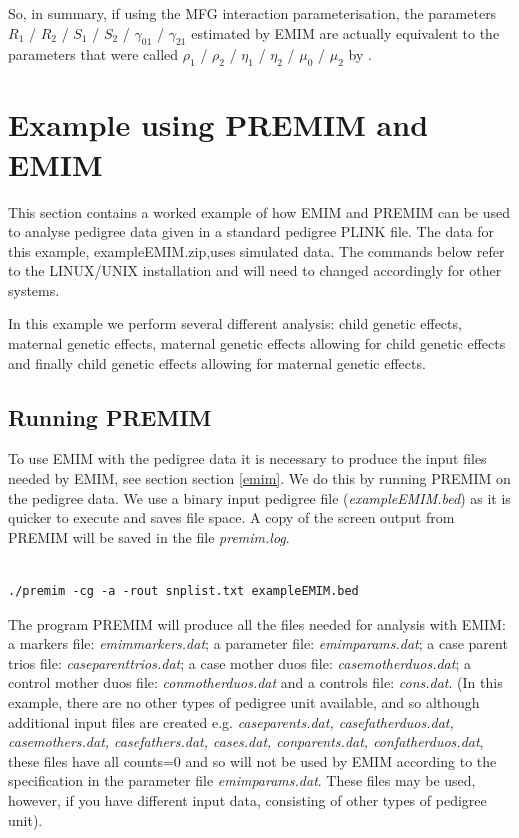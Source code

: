 \documentclass[a4paper,12pt]{article}
\begin{document}
So, in summary, if using the \citet{sinsheimer:etal:03} MFG interaction parameterisation, the parameters $R_1$ / $R_2$ / $S_1$ / $S_2$ / $\gamma_{01}$ / $\gamma_{21}$ estimated by EMIM are actually equivalent to the parameters that were called $\rho_1$ / $\rho_2$ / $\eta_1$ / $\eta_2$ / $\mu_0$ / $\mu_2$ by \citet{sinsheimer:etal:03}. 




\section{Example using PREMIM and EMIM}
\label{example}

This section contains a worked example of how EMIM and PREMIM can be used to analyse pedigree data given in a standard pedigree PLINK file. The data for this example, exampleEMIM.zip,uses simulated data. The commands below refer to the LINUX/UNIX installation and will need to changed accordingly for other systems. 

In this example we perform several different analysis: child genetic effects, maternal genetic effects, maternal genetic effects allowing for child genetic effects and finally child genetic effects allowing for maternal genetic effects. 
\subsection{Running PREMIM}
\label{eg-run-premim}

To use EMIM with the pedigree data it is necessary to produce the input files needed by EMIM, see section  section \ref{emim}. We do this by running PREMIM on the pedigree data. We use a binary input pedigree file ({\it exampleEMIM.bed}) as it is quicker to execute and saves file space. A copy of the screen output from PREMIM will be saved in the file {\it premim.log}. 
\vspace{0.35cm} \begin{lstlisting}

./premim -cg -a -rout snplist.txt exampleEMIM.bed

\end{lstlisting} \vspace{0.35cm}
The program PREMIM will produce all the files needed for analysis with EMIM: a markers file: {\it emimmarkers.dat}; a parameter file: {\it emimparams.dat}; a case parent trios file: {\it caseparenttrios.dat}; a case mother duos file: {\it casemotherduos.dat}; a control mother duos file: {\it conmotherduos.dat} and a controls file: {\it cons.dat}. (In this example, there are no other types of pedigree unit available, and so although additional input files are created e.g. {\it caseparents.dat, casefatherduos.dat, casemothers.dat, casefathers.dat, cases.dat, conparents.dat, confatherduos.dat}, these files have all counts=0 and so will not be used by EMIM according to the specification in the parameter file {\it emimparams.dat}. These files may be used, however, if you have different input data, consisting of other types of pedigree unit). 
\end{document}
